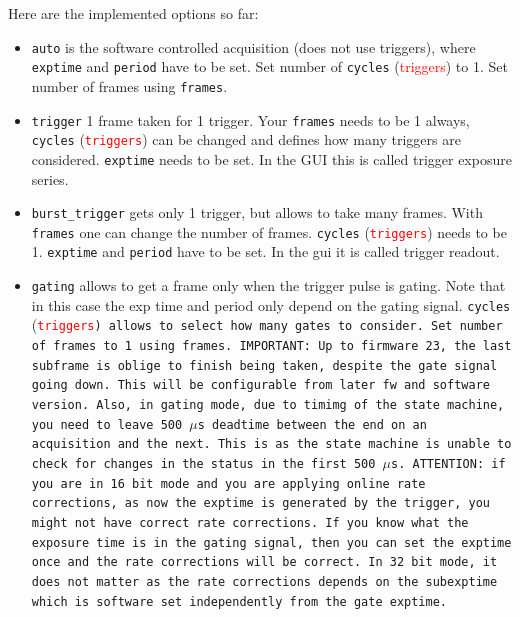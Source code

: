 \documentclass{article}
\begin{document}
{{{Here are the implemented options so far:
\begin{itemize}
\item {\tt{auto}} is the software controlled acquisition (does not use triggers), where {\tt{exptime}} and {\tt{period}} have to be set. Set number of {\tt{cycles}} (\textcolor{red}{triggers}) to 1. Set number of frames using {\tt{frames}}.
\item {\tt{trigger}} 1 frame taken for 1 trigger. Your {\tt{frames}} needs to be  1 always, {\tt{cycles}} ({\tt{\textcolor{red}{triggers}}}) can be changed and defines how many triggers are considered.  {\tt{exptime}} needs to be set. In the GUI this is called trigger exposure series.  
\item {\tt{burst\_trigger}} gets only 1 trigger, but allows to take many frames. With {\tt{frames}} one can change the number of frames. {\tt{cycles}} ({\tt{\textcolor{red}{triggers}}}) needs to be 1.  {\tt{exptime}} and {\tt{period}} have to be set. In the gui it is called trigger readout.
\item{\tt{gating}} allows to get a frame only when the trigger pulse is gating. Note that in this case the exp time and period only depend on the gating signal. {\tt{cycles}} (\tt{\textcolor{red}{triggers}}) allows to select how many gates to consider.  Set number of frames to 1 using {\tt{frames}}. IMPORTANT: Up to firmware 23, the last subframe is oblige to finish being taken, despite the gate signal going down. This will be configurable from later fw and software version. Also, in gating mode, due to timimg of the state machine, you need to leave 500~$\mu$s deadtime between the end on an acquisition and the next. This is as the state machine is unable to check for changes in the status in the first 500~$\mu$s. ATTENTION: if you are in 16 bit mode and you are applying online rate corrections, as now the exptime is generated by the trigger, you might not have correct rate corrections. If you know what the exposure time is in the gating signal, then you can set the {\tt{exptime}} once and the rate corrections will be correct. In 32 bit mode, it does not matter as the rate corrections depends on the {\tt{subexptime}} which is software set independently from the gate exptime.


\end{itemize}}}}
\end{document}
